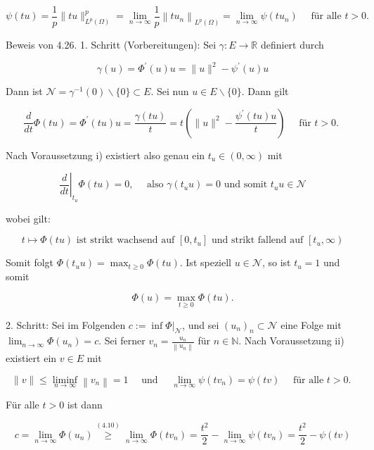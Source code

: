 \documentclass[10pt, letterpaper]{article}
\begin{document}
$$
\psi(t u)=\frac{1}{p}\|t u\|_{L^{p}(\Omega)}^{p}=\lim _{n \rightarrow \infty} \frac{1}{p}\left\|t u_{n}\right\|_{L^{p}(\Omega)}=\lim _{n \rightarrow \infty} \psi\left(t u_{n}\right) \quad \text { für alle } t>0 .
$$

Beweis von 4.26. 1. Schritt (Vorbereitungen): Sei $\gamma: E \rightarrow \mathbb{R}$ definiert durch

$$
\gamma(u)=\Phi^{\prime}(u) u=\|u\|^{2}-\psi^{\prime}(u) u
$$

Dann ist $\mathcal{N}=\gamma^{-1}(0) \backslash\{0\} \subset E$. Sei nun $u \in E \backslash\{0\}$. Dann gilt

$$
\frac{d}{d t} \Phi(t u)=\Phi^{\prime}(t u) u=\frac{\gamma(t u)}{t}=t\left(\|u\|^{2}-\frac{\psi^{\prime}(t u) u}{t}\right) \quad \text { für } t>0 \text {. }
$$

Nach Voraussetzung i) existiert also genau ein $t_{u} \in(0, \infty)$ mit

$$
\left.\frac{d}{d t}\right|_{t_{u}} \Phi(t u)=0, \quad \text { also } \gamma\left(t_{u} u\right)=0 \text { und somit } t_{u} u \in \mathcal{N}
$$

wobei gilt:

$$
t \mapsto \Phi(t u) \text { ist strikt wachsend auf }\left[0, t_{u}\right] \text { und strikt fallend auf }\left[t_{u}, \infty\right)
$$

Somit folgt $\Phi\left(t_{u} u\right)=\max _{t \geq 0} \Phi(t u)$. Ist speziell $u \in \mathcal{N}$, so ist $t_{u}=1$ und somit

$$
\Phi(u)=\max _{t \geq 0} \Phi(t u) .
$$

2. Schritt: Sei im Folgenden $c:=\left.\inf \Phi\right|_{\mathcal{N}}$, und sei $\left(u_{n}\right)_{n} \subset \mathcal{N}$ eine Folge mit $\lim _{n \rightarrow \infty} \Phi\left(u_{n}\right)=c$. Sei ferner $v_{n}=\frac{u_{n}}{\left\|u_{n}\right\|}$ für $n \in \mathbb{N}$. Nach Voraussetzung ii) existiert ein $v \in E$ mit

$$
\|v\| \leq \liminf _{n \rightarrow \infty}\left\|v_{n}\right\|=1 \quad \text { und } \quad \lim _{n \rightarrow \infty} \psi\left(t v_{n}\right)=\psi(t v) \quad \text { für alle } t>0 \text {. }
$$

Für alle $t>0$ ist dann

$$
c=\lim _{n \rightarrow \infty} \Phi\left(u_{n}\right) \stackrel{(4.10)}{\geq} \lim _{n \rightarrow \infty} \Phi\left(t v_{n}\right)=\frac{t^{2}}{2}-\lim _{n \rightarrow \infty} \psi\left(t v_{n}\right)=\frac{t^{2}}{2}-\psi(t v)
$$
\end{document}
